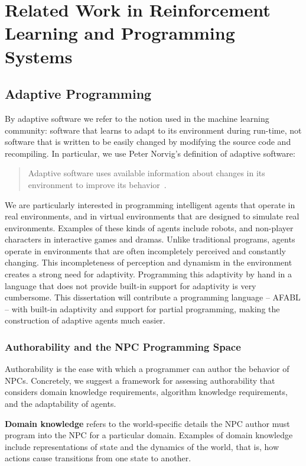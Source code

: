 \chapter{Related Work in Reinforcement Learning and Programming Systems}

\section{Adaptive Programming}

By adaptive software we refer to the notion used in the machine learning community: software that learns to adapt to its environment during run-time, not software that is written to be easily changed by modifying the source code and recompiling.  In particular, we use Peter Norvig's definition of adaptive software:

\begin{quote}
Adaptive software uses available information about changes in its
environment to improve its behavior~\cite{norvig1998adaptive}.
\end{quote}

We are particularly interested in programming intelligent agents that operate in real environments, and in virtual environments that are designed to simulate real environments.  Examples of these kinds of agents include robots, and non-player characters in interactive games and dramas.  Unlike traditional programs, agents operate in environments that are often incompletely perceived and constantly changing.  This incompleteness of perception and dynamism in the environment creates a strong need for adaptivity.  Programming this adaptivity by hand in a language that does not provide built-in support for adaptivity is very cumbersome.  This dissertation will contribute a programming language -- AFABL -- with built-in adaptivity and support for partial programming, making the construction of adaptive agents much easier.

\subsection{Authorability and the NPC Programming Space}

Authorability is the ease with which a programmer can author the behavior of NPCs.  Concretely, we suggest a framework for assessing authorability that considers domain knowledge requirements, algorithm knowledge requirements, and the adaptability of agents.

{\bf Domain knowledge} refers to the world-specific details the NPC author must program into the NPC for a particular domain.  Examples of domain knowledge include representations of state and the dynamics of the world, that is, how actions cause transitions from one state to another.

